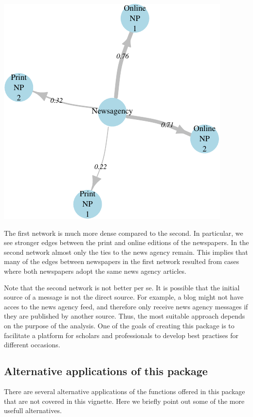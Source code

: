 \documentclass[]{article}
\begin{document}
\begin{center}\includegraphics{vignette_files/figure-latex/unnamed-chunk-21-1} \end{center}

The first network is much more dense compared to the second. In
particular, we see stronger edges between the print and online editions
of the newspapers. In the second network almost only the ties to the
news agency remain. This implies that many of the edges between
newspapers in the first network resulted from cases where both
newspapers adopt the same news agency articles.

Note that the second network is not better per se. It is possible that
the initial source of a message is not the direct source. For example, a
blog might not have acces to the news agency feed, and therefore only
receive news agency messages if they are published by another source.
Thus, the most suitable approach depends on the purpose of the analysis.
One of the goals of creating this package is to facilitate a platform
for scholars and professionals to develop best practises for different
occasions.

\subsection{Alternative applications of this
package}\label{alternative-applications-of-this-package}

There are several alternative applications of the functions offered in
this package that are not covered in this vignette. Here we briefly
point out some of the more usefull alternatives.
\end{document}
